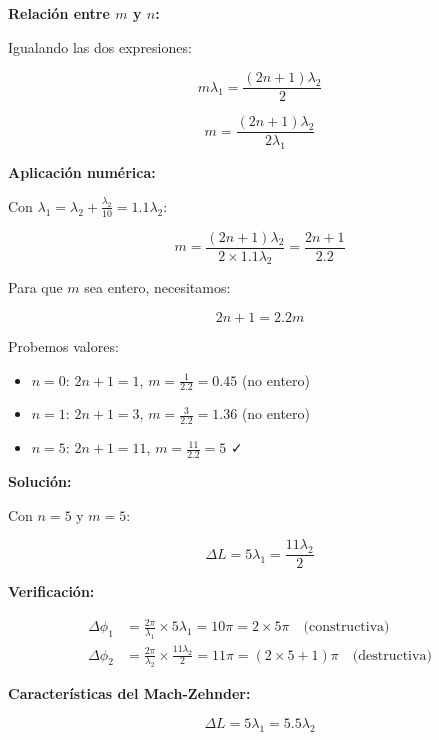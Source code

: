 \documentclass[12pt,a4paper]{article}
\begin{document}
\textbf{Relación entre $m$ y $n$:}

Igualando las dos expresiones:

\begin{equation}
    m\lambda_1 = \frac{(2n+1)\lambda_2}{2}
\end{equation}

\begin{equation}
    m = \frac{(2n+1)\lambda_2}{2\lambda_1}
\end{equation}

\textbf{Aplicación numérica:}

Con $\lambda_1 = \lambda_2 + \frac{\lambda_2}{10} = 1.1\lambda_2$:

\begin{equation}
    m = \frac{(2n+1)\lambda_2}{2 \times 1.1\lambda_2} = \frac{2n+1}{2.2}
\end{equation}

Para que $m$ sea entero, necesitamos:

\begin{equation}
    2n+1 = 2.2m
\end{equation}

Probemos valores:
\begin{itemize}
    \item $n=0$: $2n+1 = 1$, $m = \frac{1}{2.2} = 0.45$ (no entero)
    \item $n=1$: $2n+1 = 3$, $m = \frac{3}{2.2} = 1.36$ (no entero)
    \item $n=5$: $2n+1 = 11$, $m = \frac{11}{2.2} = 5$ ✓
\end{itemize}

\textbf{Solución:}

Con $n=5$ y $m=5$:

\begin{equation}
    \Delta L = 5\lambda_1 = \frac{11\lambda_2}{2}
\end{equation}

\textbf{Verificación:}

\begin{align}
    \Delta\phi_1 &= \frac{2\pi}{\lambda_1} \times 5\lambda_1 = 10\pi = 2 \times 5\pi \quad \text{(constructiva)} \\
    \Delta\phi_2 &= \frac{2\pi}{\lambda_2} \times \frac{11\lambda_2}{2} = 11\pi = (2 \times 5 + 1)\pi \quad \text{(destructiva)}
\end{align}

\textbf{Características del Mach-Zehnder:}

\begin{equation}
    \boxed{\Delta L = 5\lambda_1 = 5.5\lambda_2}
\end{equation}
\end{document}
